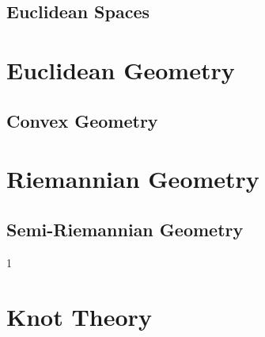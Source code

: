 \documentclass{book}                                                           %
\def\compilegeotop{0}
\begin{document}
                \chapter{Euclidean Spaces}
                    \renewcommand{\PATH}{\PARPATH/Euclidean_Spaces}
                    \label{chapt:Euclidean_Spaces}%
                    
            \part{Euclidean Geometry}
                \renewcommand{\PARPATH}{\TOPPATH/Geometry/Euclidean_Geometry}
                \chapter{Convex Geometry}
                    \renewcommand{\PATH}{\PARPATH/Convex_Geometry}
                    \label{chapt:Euclidean_Spaces}%
                    
            \part{Riemannian Geometry}
                \renewcommand{\PARPATH}{\TOPPATH/Geometry/Riemannian_Geometry}
                \chapter{Semi-Riemannian Geometry}
                    \renewcommand{\PATH}{\PARPATH/Semi_Riemannian_Geometry}
                    \label{chapt:Semi_Riemannian}%
                    
        \clearpage
        \setcounter{endpage}{\thepage}
    \fi

    \if\compilegeotop1
            \label{book:Geometric_Topology}%
            \renewcommand{\PATH}{\TOPPATH/Geometric_Topology}
            \setcounter{page}{\value{endpage}}
            \part{Knot Theory}
                
        \clearpage
        \setcounter{endpage}{\thepage}
    \fi
\end{document}
